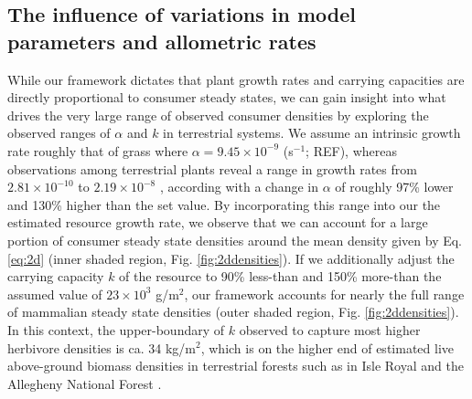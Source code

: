 \documentclass[]{rsos}%
\begin{document}









\subsection{The influence of variations in model parameters and allometric rates}


While our framework dictates that plant growth rates and carrying capacities are directly proportional to consumer steady states, we can gain insight into what drives the very large range of observed consumer densities by exploring the observed ranges of $\alpha$ and $k$ in terrestrial systems.
We assume an intrinsic growth rate roughly that of grass where $\alpha = 9.45\times 10^{-9}$ (s${}^{-1}$; REF), whereas observations among terrestrial plants reveal a range in growth rates from $2.81\times 10^{-10}$ to $2.19\times 10^{-8}$ \cite{michaletz2014convergence}, according with a change in $\alpha$ of roughly 97\% lower and 130\% higher than the set value. 
By incorporating this range into our the estimated resource growth rate, we observe that we can account for a large portion of consumer steady state densities around the mean density given by Eq. \ref{eq:2d} (inner shaded region, Fig. \ref{fig:2ddensities}).
If we additionally adjust the carrying capacity $k$ of the resource to 90\% less-than and 150\% more-than the assumed value of $23\times 10^3$ g/m${}^2$, our framework accounts for nearly the full range of mammalian steady state densities (outer shaded region, Fig. \ref{fig:2ddensities}).
In this context, the upper-boundary of $k$ observed to capture most higher herbivore densities is ca. 34 kg/m${}^2$, which is on the higher end of estimated live above-ground biomass densities in terrestrial forests such as in Isle Royal and the Allegheny National Forest \cite{de2017simulating}.
\end{document}
